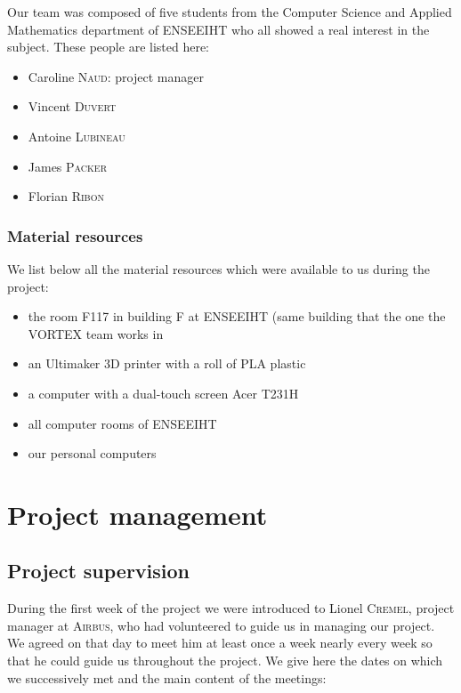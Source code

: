 \documentclass{report}
\begin{document}
	Our team was composed of five students from the Computer Science and Applied Mathematics department of ENSEEIHT who all showed a real interest in the subject. These people are listed here:

\begin{itemize}
	\item Caroline \textsc{Naud}: project manager
	\item Vincent \textsc{Duvert}
	\item Antoine \textsc{Lubineau}
	\item James \textsc{Packer}
	\item Florian \textsc{Ribon}
\end{itemize}

\subsection{Material resources}

	We list below all the material resources which were available to us during the project:

\begin{itemize}
	\item the room F117 in building F at ENSEEIHT (same building that the one the \textsc{VORTEX} team works in
	\item an Ultimaker 3D printer with a roll of PLA plastic
	\item a computer with a dual-touch screen Acer T231H
	\item all computer rooms of ENSEEIHT
	\item our personal computers
\end{itemize}

\chapter{Project management}

\section{Project supervision}

	During the first week of the project we were introduced to Lionel \textsc{Cremel}, project manager at \textsc{Airbus}, who had volunteered to guide us in managing our project. We agreed on that day to meet him at least once a week nearly every week so that he could guide us throughout the project. We give here the dates on which we successively met and the main content of the meetings:
	
\end{document}
